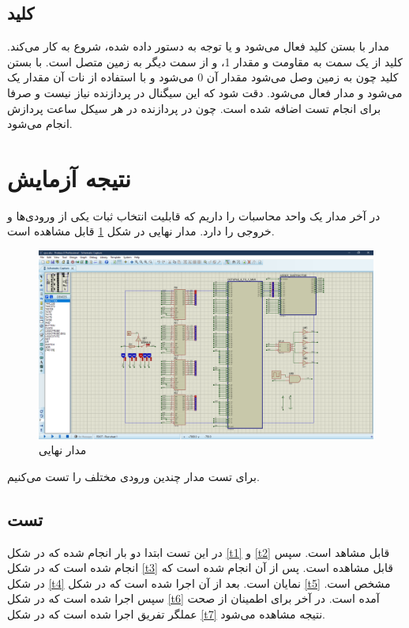 \documentclass[fleqn]{article}
\begin{document}
\subsection{کلید }

مدار با بستن کلید 
فعال می‌شود و یا توجه به دستور داده شده، شروع به کار می‌کند. کلید 
از یک سمت به مقاومت و مقدار 1، و از سمت دیگر به زمین متصل است. با بستن کلید چون به زمین وصل می‌شود مقدار آن 0 می‌شود و با استفاده از نات آن مقدار 
یک می‌شود و مدار فعال می‌شود. 
دقت شود که این سیگنال در پردازنده نیاز نیست و صرفا برای انجام تست اضافه شده است. چون در پردازنده در هر سیکل ساعت 
پردازش انجام می‌شود.

\section{نتیجه آزمایش}

در آخر مدار یک واحد محاسبات را داریم که قابلیت انتخاب ثبات یکی از ورودی‌ها و خروجی را دارد. مدار نهایی 
در شکل 
\ref{final}
قابل مشاهده است. 

\begin{figure}[!htbp]
  \includegraphics[width=\textwidth]{Assets/final.png}
  \caption{مدار نهایی}
  \label{final}
\end{figure}

برای تست مدار چندین ورودی مختلف را تست می‌کنیم. 

\subsection{تست}

در این تست ابتدا دو بار 
انجام شده که در شکل 
\ref{t1}
و
\ref{t2}
قابل مشاهد است. سپس 
انجام شده است که در شکل 
\ref{t3}
قابل مشاهده است. پس از آن 
انجام شده است که در شکل 
\ref{t4}
نمایان است. بعد از آن 
اجرا شده است که در شکل 
\ref{t5}
مشخص است. سپس 
اجرا شده است که در شکل 
\ref{t6}
آمده است. 
در آخر برای اطمینان از صحت عملگر تفریق 
اجرا شده است که در شکل 
\ref{t7}
نتیجه مشاهده می‌شود. 
\end{document}
